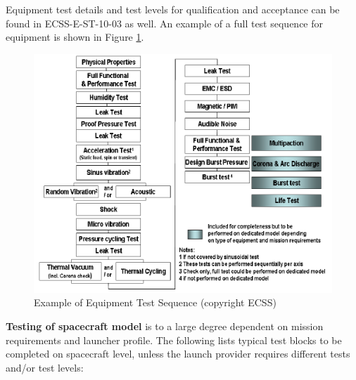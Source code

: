 Equipment test details and test levels for qualification and acceptance can be found in ECSS-E-ST-10-03 \cite{ECSS-E-ST-10-03} as well. An example of a full test sequence for equipment is shown in Figure \ref{fig:Example of Equipment Test Sequence}. 

\begin{figure}[h]
\centering\includegraphics[scale=0.7]{fig/example_of_equipment_test_sequence}
\caption{Example of Equipment Test Sequence (copyright ECSS)}
\label{fig:Example of Equipment Test Sequence}
\end{figure}

\textbf{Testing of spacecraft model} is to a large degree dependent on mission requirements and launcher profile. The following lists typical test blocks to be completed on spacecraft level, unless the launch provider requires different tests and/or test levels:

